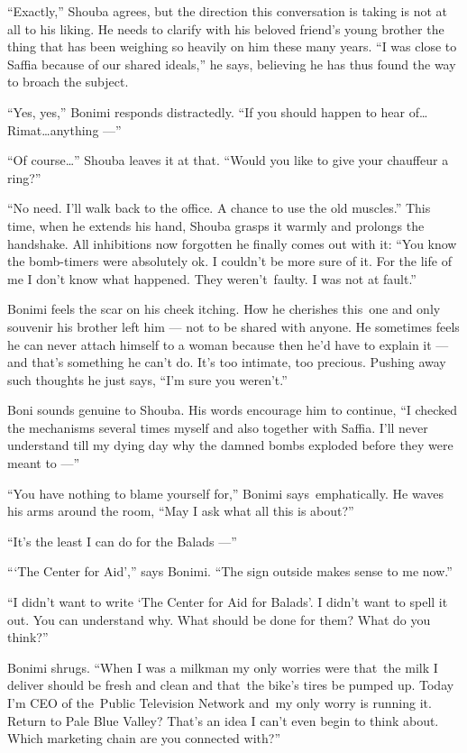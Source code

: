 \documentclass[twoside,11pt]{book}
\begin{document}
``Exactly,'' Shouba agrees, but the direction this conversation is taking is not at all to his
liking. He needs to clarify with his beloved friend's young brother the thing that has been weighing so heavily on him
these many years. ``I was close to Saffia because of our shared ideals,'' he says, believing
he has thus found the way to broach the subject.

``Yes, yes,'' Bonimi responds distractedly. ``If you should happen to hear
of{\ldots}Rimat{\ldots}anything ---''

``Of course{{\ldots}}'' Shouba leaves it at that.
``Would you like to give your chauffeur a ring?''

``No need. I'll walk back to the office.  A chance to use the old muscles.'' This time, when
he extends his hand, Shouba grasps it warmly and prolongs the handshake. All inhibitions now forgotten he finally comes
out with it: ``You know the bomb-timers were absolutely ok. I couldn't be more sure of it. For the life of
me I don't know what happened. They weren't~faulty. I was not at fault.''

Bonimi feels the scar on his cheek itching. How he cherishes this~one and only souvenir his brother left him --- not to be
shared with anyone. He sometimes feels he can never attach himself to a woman because then he'd have to explain it ---
and that's something he can't do. It's too intimate, too precious. Pushing away such thoughts he just says,
``I'm sure you weren't.''

Boni sounds genuine to Shouba. His words encourage him to continue, ``I checked the mechanisms several
times myself and also together with Saffia. I'll never understand till my dying
day{ }why the damned{ }bombs exploded
before they were meant to ---''

``You have nothing to blame yourself for,'' Bonimi says~emphatically. He waves his arms around
the room, ``May I ask what all this is about?''

``It's the least I can do for the Balads ---''

``{\thinspace}`The Center for Aid','' says Bonimi. ``The sign outside makes sense to me now.''

``I didn't want to write `The Center for Aid for Balads'. I didn't want to spell it out. You can understand
why. What should be done for them? What do you think?''

Bonimi shrugs. ``When I was a milkman my only worries were that~the milk I deliver should be fresh and
clean and that~the bike's tires be pumped up. Today I'm CEO of the~Public Television Network and~my only worry is
running it.~ Return to Pale Blue Valley? That's an idea I can't even begin to think about. Which marketing chain are
you connected with?''
\end{document}
